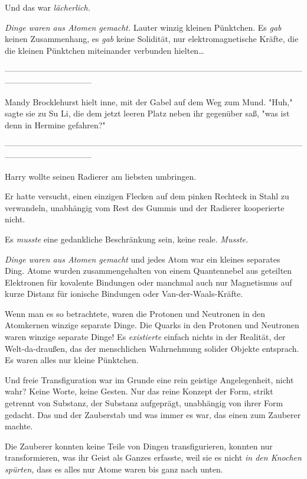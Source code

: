 {Und das war \emph{lächerlich.}

\emph{Dinge waren aus Atomen gemacht.} Lauter winzig kleinen Pünktchen. Es \emph{gab} keinen Zusammenhang, es \emph{gab} keine Solidität, nur elektromagnetische Kräfte, die die kleinen Pünktchen miteinander verbunden hielten…

--------------------------------------------------------------------------------------------------------------------------------------------

Mandy Brocklehurst hielt inne, mit der Gabel auf dem Weg zum Mund. "Huh," sagte sie zu Su Li, die dem jetzt leeren Platz neben ihr gegenüber saß, "was ist denn in Hermine gefahren?"

--------------------------------------------------------------------------------------------------------------------------------------------

Harry wollte seinen Radierer am liebsten umbringen.

Er hatte versucht, einen einzigen Flecken auf dem pinken Rechteck in Stahl zu verwandeln, unabhängig vom Rest des Gummis und der Radierer kooperierte nicht.

Es \emph{musste} eine gedankliche Beschränkung sein, keine reale. \emph{Musste.}

\emph{Dinge waren aus Atomen gemacht} und jedes Atom war ein kleines separates Ding. Atome wurden zusammengehalten von einem Quantennebel aus geteilten Elektronen für kovalente Bindungen oder manchmal auch nur Magnetismus auf kurze Distanz für ionische Bindungen oder Van-der-Waals-Kräfte.

Wenn man es so betrachtete, waren die Protonen und Neutronen in den Atomkernen winzige separate Dinge. Die Quarks in den Protonen und Neutronen waren winzige separate Dinge! Es \emph{existierte} einfach nichts in der Realität, der Welt-da-draußen, das der menschlichen Wahrnehmung solider Objekte entsprach. Es waren alles nur kleine Pünktchen.

Und freie Transfiguration war im Grunde eine rein geistige Angelegenheit, nicht wahr? Keine Worte, keine Gesten. Nur das reine Konzept der Form, strikt getrennt von Substanz, der Substanz aufgeprägt, unabhängig von ihrer Form gedacht. Das und der Zauberstab und was immer es war, das einen zum Zauberer machte.

Die Zauberer konnten keine Teile von Dingen transfigurieren, konnten nur transformieren, was ihr Geist als Ganzes erfasste, weil sie es nicht \emph{in den Knochen spürten,} dass es alles nur Atome waren bis ganz nach unten.

}
